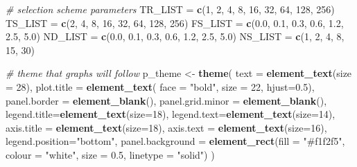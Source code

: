 \documentclass[]{book}
\newenvironment{Shaded}{\begin{snugshade}}{\end{snugshade}}
\newcommand{\CommentTok}[1]{\textcolor[rgb]{0.56,0.35,0.01}{\textit{#1}}}
\newcommand{\DataTypeTok}[1]{\textcolor[rgb]{0.13,0.29,0.53}{#1}}
\newcommand{\DecValTok}[1]{\textcolor[rgb]{0.00,0.00,0.81}{#1}}
\newcommand{\FloatTok}[1]{\textcolor[rgb]{0.00,0.00,0.81}{#1}}
\newcommand{\KeywordTok}[1]{\textcolor[rgb]{0.13,0.29,0.53}{\textbf{#1}}}
\newcommand{\NormalTok}[1]{#1}
\newcommand{\StringTok}[1]{\textcolor[rgb]{0.31,0.60,0.02}{#1}}
\begin{document}
\begin{Shaded}
\begin{Highlighting}[]
\CommentTok{# selection scheme parameters}
\NormalTok{TR_LIST =}\StringTok{ }\KeywordTok{c}\NormalTok{(}\DecValTok{1}\NormalTok{, }\DecValTok{2}\NormalTok{, }\DecValTok{4}\NormalTok{, }\DecValTok{8}\NormalTok{, }\DecValTok{16}\NormalTok{, }\DecValTok{32}\NormalTok{, }\DecValTok{64}\NormalTok{, }\DecValTok{128}\NormalTok{, }\DecValTok{256}\NormalTok{)}
\NormalTok{TS_LIST =}\StringTok{ }\KeywordTok{c}\NormalTok{(}\DecValTok{2}\NormalTok{, }\DecValTok{4}\NormalTok{, }\DecValTok{8}\NormalTok{, }\DecValTok{16}\NormalTok{, }\DecValTok{32}\NormalTok{, }\DecValTok{64}\NormalTok{, }\DecValTok{128}\NormalTok{, }\DecValTok{256}\NormalTok{)}
\NormalTok{FS_LIST =}\StringTok{ }\KeywordTok{c}\NormalTok{(}\FloatTok{0.0}\NormalTok{, }\FloatTok{0.1}\NormalTok{, }\FloatTok{0.3}\NormalTok{, }\FloatTok{0.6}\NormalTok{, }\FloatTok{1.2}\NormalTok{, }\FloatTok{2.5}\NormalTok{, }\FloatTok{5.0}\NormalTok{)}
\NormalTok{ND_LIST =}\StringTok{ }\KeywordTok{c}\NormalTok{(}\FloatTok{0.0}\NormalTok{, }\FloatTok{0.1}\NormalTok{, }\FloatTok{0.3}\NormalTok{, }\FloatTok{0.6}\NormalTok{, }\FloatTok{1.2}\NormalTok{, }\FloatTok{2.5}\NormalTok{, }\FloatTok{5.0}\NormalTok{)}
\NormalTok{NS_LIST =}\StringTok{ }\KeywordTok{c}\NormalTok{(}\DecValTok{1}\NormalTok{, }\DecValTok{2}\NormalTok{, }\DecValTok{4}\NormalTok{, }\DecValTok{8}\NormalTok{, }\DecValTok{15}\NormalTok{, }\DecValTok{30}\NormalTok{)}

\CommentTok{# theme that graphs will follow}
\NormalTok{p_theme <-}\StringTok{ }\KeywordTok{theme}\NormalTok{(}
  \DataTypeTok{text =} \KeywordTok{element_text}\NormalTok{(}\DataTypeTok{size =} \DecValTok{28}\NormalTok{),}
  \DataTypeTok{plot.title =} \KeywordTok{element_text}\NormalTok{( }\DataTypeTok{face =} \StringTok{"bold"}\NormalTok{, }\DataTypeTok{size =} \DecValTok{22}\NormalTok{, }\DataTypeTok{hjust=}\FloatTok{0.5}\NormalTok{),}
  \DataTypeTok{panel.border =} \KeywordTok{element_blank}\NormalTok{(),}
  \DataTypeTok{panel.grid.minor =} \KeywordTok{element_blank}\NormalTok{(),}
  \DataTypeTok{legend.title=}\KeywordTok{element_text}\NormalTok{(}\DataTypeTok{size=}\DecValTok{18}\NormalTok{),}
  \DataTypeTok{legend.text=}\KeywordTok{element_text}\NormalTok{(}\DataTypeTok{size=}\DecValTok{14}\NormalTok{),}
  \DataTypeTok{axis.title =} \KeywordTok{element_text}\NormalTok{(}\DataTypeTok{size=}\DecValTok{18}\NormalTok{),}
  \DataTypeTok{axis.text =} \KeywordTok{element_text}\NormalTok{(}\DataTypeTok{size=}\DecValTok{16}\NormalTok{),}
  \DataTypeTok{legend.position=}\StringTok{"bottom"}\NormalTok{,}
  \DataTypeTok{panel.background =} \KeywordTok{element_rect}\NormalTok{(}\DataTypeTok{fill =} \StringTok{"#f1f2f5"}\NormalTok{,}
                                  \DataTypeTok{colour =} \StringTok{"white"}\NormalTok{,}
                                  \DataTypeTok{size =} \FloatTok{0.5}\NormalTok{, }\DataTypeTok{linetype =} \StringTok{"solid"}\NormalTok{)}
\NormalTok{)}
\end{Highlighting}
\end{Shaded}
\end{document}
